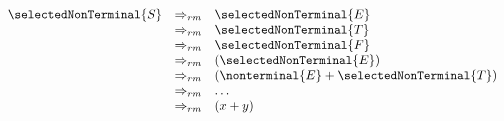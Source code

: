 $\begin{array}{rcl}
\selectedNonTerminal{S} & \Rightarrow_{rm} & \selectedNonTerminal{E} \\
& \Rightarrow_{rm} & \selectedNonTerminal{T} \\
& \Rightarrow_{rm} & \selectedNonTerminal{F} \\
& \Rightarrow_{rm} & (\selectedNonTerminal{E}) \\
& \Rightarrow_{rm} & (\nonterminal{E}+\selectedNonTerminal{T}) \\
& \Rightarrow_{rm} & \ldots \\
& \Rightarrow_{rm} & (x+y) \\
\end{array}$